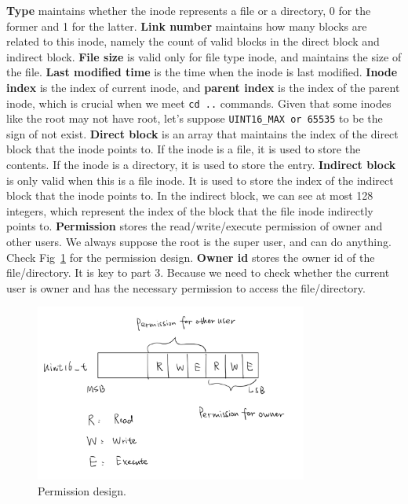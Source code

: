\textbf{Type} maintains whether the inode represents a file or a directory, 0 for the former and 1 for the latter.
\textbf{Link number} maintains how many blocks are related to this inode, namely the count of valid blocks in the direct block and indirect block.
\textbf{File size} is valid only for file type inode, and maintains the size of the file.
\textbf{Last modified time} is the time when the inode is last modified.
\textbf{Inode index} is the index of current inode, and \textbf{parent index} is the index of the parent inode, which is crucial when we meet \texttt{cd ..} commands. Given that some inodes like the root
may not have root, let's suppose \texttt{UINT16_MAX or 65535} to be the sign of not exist.
\textbf{Direct block} is an array that maintains the index of the direct block that the inode points to. If the inode is a file, it is used to store the contents. If 
the inode is a directory, it is used to store the entry. 
\textbf{Indirect block} is only valid when this is a file inode. It is used to store the index of the indirect block that the inode points to. In the indirect block, we can see at most
128 integers, which represent the index of the block that the file inode indirectly points to. 
\textbf{Permission} stores the read/write/execute permission of owner and other users. We always suppose the root is the super user, and can do anything. Check Fig~\ref{fig:permission} for the permission design.
\textbf{Owner id} stores the owner id of the file/directory. It is key to part 3. Because we need to check whether the current user is owner and has the necessary permission to access the file/directory.

\begin{figure}[!h]
    \centering
    \includegraphics[width=0.8\textwidth]{fig/permission.jpeg}
    \caption{Permission design.}
    \label{fig:permission}
\end{figure}

